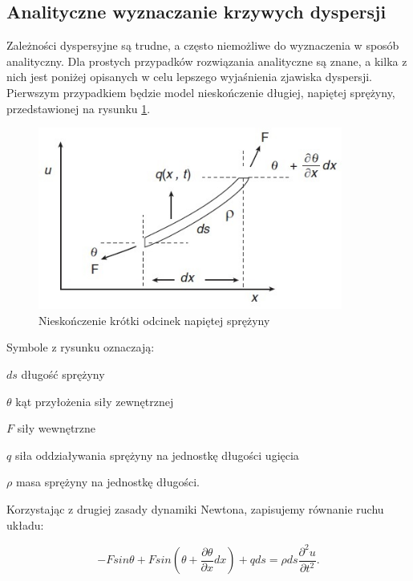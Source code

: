 
\subsection{Analityczne wyznaczanie krzywych dyspersji}

Zależności dyspersyjne są trudne, a często niemożliwe do wyznaczenia w sposób analityczny. Dla prostych przypadków rozwiązania analityczne są znane, a kilka z nich jest poniżej opisanych w celu lepszego wyjaśnienia zjawiska dyspersji.
Pierwszym przypadkiem będzie model nieskończenie długiej, napiętej sprężyny, przedstawionej na rysunku \ref{fig:nieskonczenie_krotki_odcinek_sprezyny}.

\begin{figure}[h]
\centering
\includegraphics[width=10cm]{Zdjecia/2/dyspersja_analitycznie_sprezyna}
\caption{Nieskończenie krótki odcinek napiętej sprężyny}
\label{fig:nieskonczenie_krotki_odcinek_sprezyny}
\end{figure}

Symbole z rysunku oznaczają:

\begin{eqwhere}[2cm]
        \item[$ds$] długość sprężyny
        \item[$\theta$] kąt przyłożenia siły zewnętrznej
        \item[$F$] siły wewnętrzne
        \item[$q$] siła oddziaływania sprężyny na jednostkę długości ugięcia
        \item[$\rho$] masa sprężyny na jednostkę długości.
\end{eqwhere}

Korzystając z drugiej zasady dynamiki Newtona, zapisujemy równanie ruchu układu:

\begin{equation}
-Fsin\theta+Fsin(\theta+\frac{\partial \theta}{\partial x}dx)+qds = \rho ds \frac{\partial^2u}{\partial t^2}.
\end{equation}

